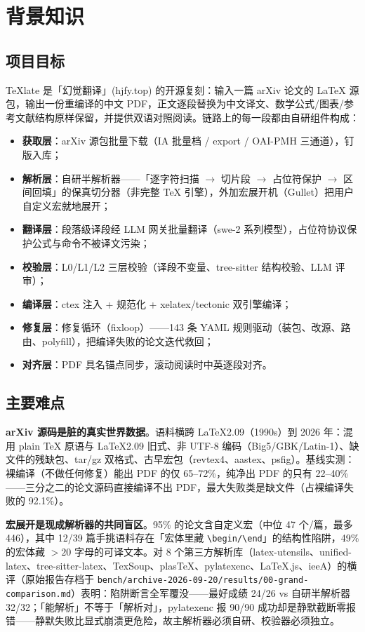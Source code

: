 \section{背景知识}

\subsection{项目目标}

TeXlate 是「幻觉翻译」(hjfy.top) 的开源复刻：输入一篇 arXiv 论文的 LaTeX 源包，输出一份重编译的中文 PDF，正文逐段替换为中文译文、数学公式/图表/参考文献结构原样保留，并提供双语对照阅读。链路上的每一段都由自研组件构成：

\begin{itemize}
  \item \textbf{获取层}：arXiv 源包批量下载（IA 批量档 / export / OAI-PMH 三通道），钉版入库；
  \item \textbf{解析层}：自研半解析器——「逐字符扫描 $\to$ 切片段 $\to$ 占位符保护 $\to$ 区间回填」的保真切分器（非完整 TeX 引擎），外加宏展开机（Gullet）把用户自定义宏就地展开；
  \item \textbf{翻译层}：段落级译段经 LLM 网关批量翻译（swe-2 系列模型），占位符协议保护公式与命令不被译文污染；
  \item \textbf{校验层}：L0/L1/L2 三层校验（译段不变量、tree-sitter 结构校验、LLM 评审）；
  \item \textbf{编译层}：ctex 注入 + 规范化 + xelatex/tectonic 双引擎编译；
  \item \textbf{修复层}：修复循环（fixloop）——143 条 YAML 规则驱动（装包、改源、路由、polyfill），把编译失败的论文迭代救回；
  \item \textbf{对齐层}：PDF 具名锚点同步，滚动阅读时中英逐段对齐。
\end{itemize}

\subsection{主要难点}

\textbf{arXiv 源码是脏的真实世界数据}。语料横跨 LaTeX2.09（1990s）到 2026 年：混用 plain \TeX{} 原语与 LaTeX2.09 旧式、非 UTF-8 编码（Big5/GBK/Latin-1）、缺文件的残缺包、tar/gz 双格式、古早宏包（revtex4、aastex、psfig）。基线实测：裸编译（不做任何修复）能出 PDF 的仅 65--72\%，纯净出 PDF 的只有 22--40\%——三分之二的论文源码直接编译不出 PDF，最大失败类是缺文件（占裸编译失败的 92.1\%）。

\textbf{宏展开是现成解析器的共同盲区}。95\% 的论文含自定义宏（中位 47 个/篇，最多 446），其中 12/39 篇手挑语料存在「宏体里藏 \verb|\begin/\end|」的结构性陷阱，49\% 的宏体藏 $>20$ 字母的可译文本。对 8 个第三方解析库（latex-utensils、unified-latex、tree-sitter-latex、TexSoup、plasTeX、pylatexenc、LaTeX.js、ieeA）的横评（原始报告存档于 \texttt{bench/archive-2026-09-20/results/00-grand-comparison.md}）表明：陷阱断言全军覆没——最好成绩 24/26 vs 自研半解析器 32/32；「能解析」不等于「解析对」，pylatexenc 报 90/90 成功却是静默截断零报错——静默失败比显式崩溃更危险，故主解析器必须自研、校验器必须独立。

